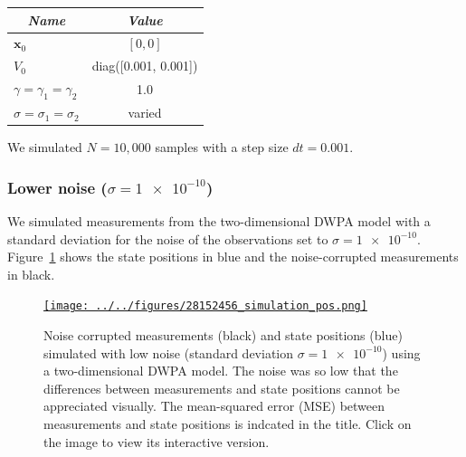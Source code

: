 \documentclass[12pt]{article}
\begin{document}
\begin{center}
    \begin{tabular}{|l|c|}\hline
        \multicolumn{1}{|c|}{\emph{Name}} & \multicolumn{1}{|c|}{\emph{Value}} \\\hline\hline
        $\mathbf{x}_0$                        & $[0, 0]$\\\hline
        $V_0$                                 & diag([0.001, 0.001])\\\hline
        $\gamma=\gamma_1=\gamma_2$            & 1.0\\\hline
        $\sigma=\sigma_1=\sigma_2$            & varied\\\hline
    \end{tabular}
\end{center}

\noindent We simulated $N=10,000$ samples with a step size $dt=0.001$.

\subsubsection{Lower noise ($\sigma=\num{1e-10}$)}

We simulated measurements from the two-dimensional DWPA model with a standard
deviation for the noise of the observations set to $\sigma=\num{1e-10}$.
Figure~\ref{fig:simulations_low_noise} shows the state positions in blue and
the noise-corrupted measurements in black.

\begin{figure}

    \centering
    \href{http://www.gatsby.ucl.ac.uk/~rapela/fwg/lds_repo/inference/figures/28152456_simulation_pos.html}{\texttt{[image: ../../figures/28152456\_simulation\_pos.png]}}

    \caption{Noise corrupted measurements (black) and state positions
    (blue) simulated with low noise (standard deviation $\sigma=\num{1e-10}$)
    using a two-dimensional DWPA model. The noise was so low that the
    differences between measurements and state positions cannot be appreciated
    visually.  The mean-squared error (MSE) between measurements and state
    positions is indcated in the title.
    Click on the image to view its interactive version.}

        \label{fig:simulations_low_noise}

\end{figure}
\end{document}
